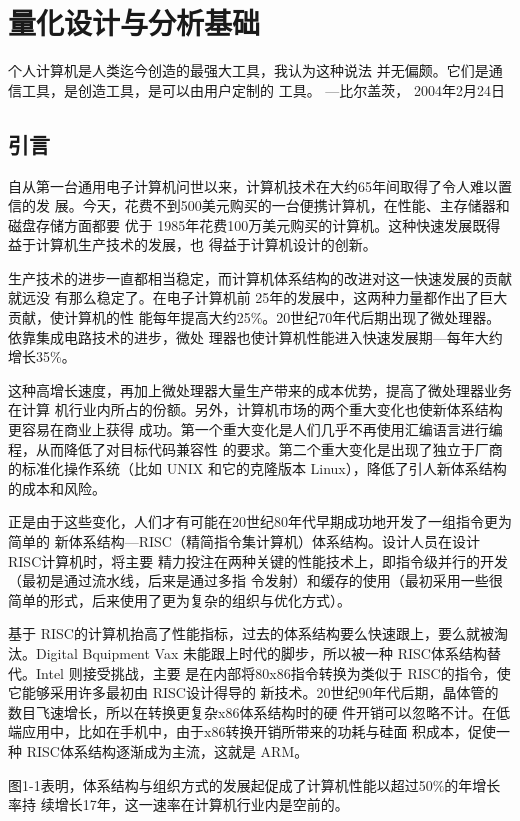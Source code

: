 \chapter{量化设计与分析基础}
个人计算机是人类迄今创造的最强大工具，我认为这种说法
并无偏颇。它们是通信工具，是创造工具，是可以由用户定制的
工具。
—比尔盖茨，
2004年2月24日

\section{引言}
自从第一台通用电子计算机问世以来，计算机技术在大约65年间取得了令人难以置信的发
展。今天，花费不到500美元购买的一台便携计算机，在性能、主存储器和磁盘存储方面都要
优于 1985年花费100万美元购买的计算机。这种快速发展既得益于计算机生产技术的发展，也
得益于计算机设计的创新。

生产技术的进步一直都相当稳定，而计算机体系结构的改进对这一快速发展的贡献就远没
有那么稳定了。在电子计算机前 25年的发展中，这两种力量都作出了巨大贡献，使计算机的性
能每年提高大约25\%。20世纪70年代后期出现了微处理器。依靠集成电路技术的进步，微处
理器也使计算机性能进入快速发展期—每年大约增长35\%。

这种高增长速度，再加上微处理器大量生产带来的成本优势，提高了微处理器业务在计算
机行业内所占的份额。另外，计算机市场的两个重大变化也使新体系结构更容易在商业上获得
成功。第一个重大变化是人们几乎不再使用汇编语言进行编程，从而降低了对目标代码兼容性
的要求。第二个重大变化是出现了独立于厂商的标准化操作系统（比如 UNIX 和它的克隆版本
Linux），降低了引人新体系结构的成本和风险。

正是由于这些变化，人们才有可能在20世纪80年代早期成功地开发了一组指令更为简单的
新体系结构—RISC（精简指令集计算机）体系结构。设计人员在设计 RISC计算机时，将主要
精力投注在两种关键的性能技术上，即指令级并行的开发（最初是通过流水线，后来是通过多指
令发射）和缓存的使用（最初采用一些很简单的形式，后来使用了更为复杂的组织与优化方式）。

基于 RISC的计算机抬高了性能指标，过去的体系结构要么快速跟上，要么就被淘汰。Digital
Bquipment Vax 未能跟上时代的脚步，所以被一种 RISC体系结构替代。Intel 则接受挑战，主要
是在内部将80x86指令转换为类似于 RISC的指令，使它能够采用许多最初由 RISC设计得导的
新技术。20世纪90年代后期，晶体管的数目飞速增长，所以在转换更复杂x86体系结构时的硬
件开销可以忽略不计。在低端应用中，比如在手机中，由于x86转换开销所带来的功耗与硅面
积成本，促使一种 RISC体系结构逐渐成为主流，这就是 ARM。

图1-1表明，体系结构与组织方式的发展起促成了计算机性能以超过50\%的年增长率持
续增长17年，这一速率在计算机行业内是空前的。

